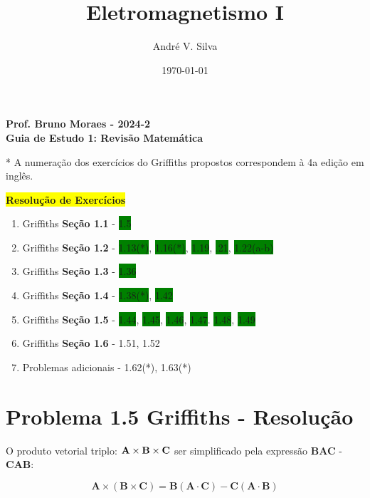 \documentclass[a4paper,12pt]{article}
\title{ \textbf{\large Eletromagnetismo I }}
\author{Andr\'e V. Silva}
\date{\today}
\begin{document}
\maketitle

\begin{center}
    \textbf{Prof. Bruno Moraes - 2024-2}\\
    \textbf{Guia de Estudo 1: Revisão Matemática}
    \end{center}
    
    * A numeração dos exercícios do Griffiths propostos correspondem à 4a edição em inglês.\\
    
    \begin{center}
    \colorbox{yellow}{\textbf{Resolu\c{c}\~ao de Exerc\'icios}}
    \end{center}
    
    \begin{enumerate}
    \item Griffiths \textbf{Seção 1.1} - \colorbox{green}{1.5} 
    \item Griffiths \textbf{Seção 1.2} - \colorbox{green}{1.13(*)}, \colorbox{green}{1.16(*)}, \colorbox{green}{1.19}, \colorbox{green}{.21}, \colorbox{green}{1.22(a-b)}
    \item Griffiths \textbf{Seção 1.3} - \colorbox{green}{1.36}
    \item Griffiths \textbf{Seção 1.4} - \colorbox{green}{1.38(*)}, \colorbox{green}{1.42}
    \item Griffiths \textbf{Seção 1.5} - \colorbox{green}{1.44}, \colorbox{green}{1.45}, \colorbox{green}{1.46}, \colorbox{green}{1.47}. \colorbox{green}{1.48}, \colorbox{green}{1.49}
    \item Griffiths \textbf{Seção 1.6} - 1.51, 1.52
    \item Problemas adicionais - 1.62(*), 1.63(*)
    \end{enumerate}

\section*{Problema 1.5 Griffiths - Resolu\c{c}\~ao}

O produto vetorial triplo: $\textrm{\textbf{A}}\times\textrm{\textbf{B}}\times\textrm{\textbf{C}}$
ser simplificado pela express\~ao \textbf{BAC} - \textbf{CAB}:

\begin{equation}
    \textbf{A}\times(\textbf{B}\times\textbf{C}) =  \textbf{B}(\textbf{A}\cdot\textbf{C}) - \textbf{C}(\textbf{A}\cdot\textbf{B})
\end{equation}
\end{document}
